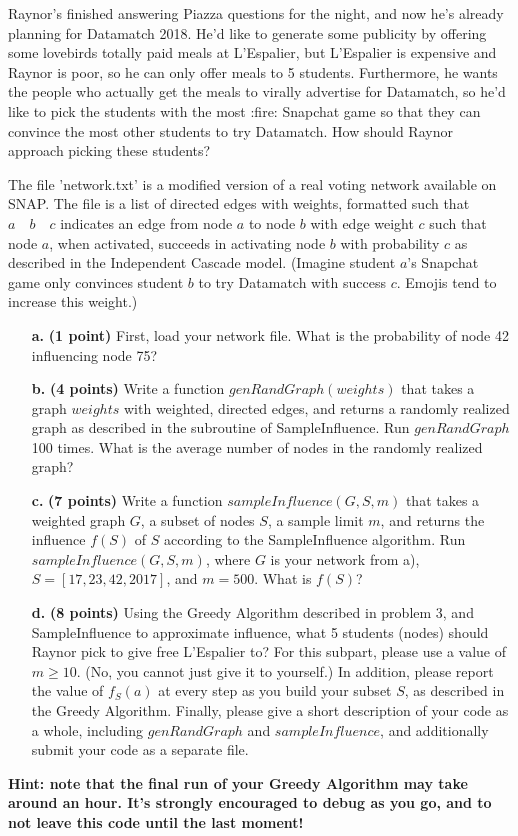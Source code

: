 \documentclass[11pt]{article}
\begin{document}
	\par Raynor's finished answering Piazza questions for the night, and now he's already planning for Datamatch 2018. He'd like to generate some publicity by offering some lovebirds totally paid meals at L'Espalier, but L'Espalier is expensive and Raynor is poor, so he can only offer meals to 5 students. Furthermore, he wants the people who actually get the meals to virally advertise for Datamatch, so he'd like to pick the students with the most :fire: Snapchat game so that they can convince the most other students to try Datamatch. How should Raynor approach picking these students?
	
	\par The file 'network.txt' is a modified version of a real voting network available on SNAP. The file is a list of directed edges with weights, formatted such that $a \quad b \quad c$ indicates an edge from node $a$ to node $b$ with edge weight $c$ such that node $a$, when activated, succeeds in activating node $b$ with probability $c$ as described in the Independent Cascade model. (Imagine student $a$'s Snapchat game only convinces student $b$ to try Datamatch with success $c$. Emojis tend to increase this weight.)
	
	
	
	\begin{itemize}
		\item[\textbf{a. }] \textbf{(1 point)} First, load your network file. What is the probability of node 42 influencing node 75?
		\item[\textbf{b. }] \textbf{(4 points)} Write a function $genRandGraph(weights)$ that takes a graph $weights$ with weighted, directed edges, and returns a randomly realized graph as described in the subroutine of SampleInfluence. Run $genRandGraph$ 100 times. What is the average number of nodes in the randomly realized graph?
		\item[\textbf{c. }] \textbf{(7 points)} Write a function $sampleInfluence(G,S,m)$ that takes a weighted graph $G$, a subset of nodes $S$, a sample limit $m$, and returns the influence $f(S)$ of $S$ according to the SampleInfluence algorithm. Run $sampleInfluence(G,S,m)$, where $G$ is your network from a), $S = [17, 23, 42, 2017]$, and $m=500$. What is $f(S)$?
		\item[\textbf{d. }] \textbf{(8 points)} Using the Greedy Algorithm described in problem 3, and SampleInfluence to approximate influence, what 5 students (nodes) should Raynor pick to give free L'Espalier to? For this subpart, please use a value of $m \ge 10$. (No, you cannot just give it to yourself.) In addition, please report the value of $f_S(a)$ at every step as you build your subset $S$, as described in the Greedy Algorithm. Finally, please give a short description of your code as a whole, including $genRandGraph$ and $sampleInfluence$, and additionally submit your code as a separate file.
	\end{itemize}
	\textbf{Hint: note that the final run of your Greedy Algorithm may take around an hour. It's strongly encouraged to debug as you go, and to not leave this code until the last moment!}
\end{document}
